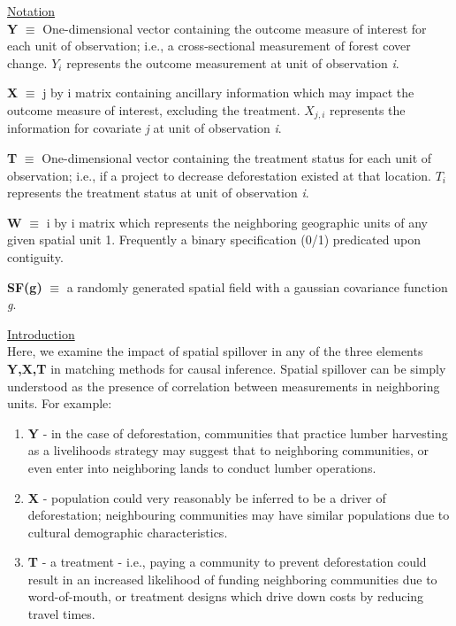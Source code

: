 \documentclass[10pt,a3paper]{report}
\begin{document}
\begin{flushleft}
\underline{Notation}\\
\vspace{0.1cm}
\textbf{Y} $\equiv$ One-dimensional vector containing the outcome measure of interest for each unit of observation; i.e., a cross-sectional measurement of forest cover change. $Y_{i}$ represents the outcome measurement at unit of observation \textit{i}. 
\vspace{0.25cm}

\textbf{X} $\equiv$ j by i matrix containing ancillary information which may impact the outcome measure of interest, excluding the treatment.  $X_{j,i}$ represents the information for covariate \textit{j} at unit of observation \textit{i}.
\vspace{0.25cm}

\textbf{T} $\equiv$ One-dimensional vector containing the treatment status for each unit of observation; i.e., if a project to decrease deforestation existed at that location.  $T_{i}$ represents the treatment status at unit of observation \textit{i}. \vspace{0.25cm}

\textbf{W} $\equiv$ i by i matrix which represents the neighboring geographic units of any given spatial unit 1.  Frequently a binary specification (0/1) predicated upon contiguity. 
\vspace{0.25cm}

\textbf{SF(g)} $\equiv$ a randomly generated spatial field with a gaussian covariance function \textit{g}.
\vspace{0.1cm}

\end{flushleft}
\underline{Introduction}\\
Here, we  examine the impact of spatial spillover in any of the three elements \textbf{Y,X,T} in matching methods for causal inference.  Spatial spillover can be simply understood as the presence of correlation between measurements in neighboring units.  For example:
\begin{enumerate}
\item \textbf{Y} - in the case of deforestation,  communities that practice lumber harvesting as a livelihoods strategy may suggest that to neighboring communities, or even enter into neighboring lands to conduct lumber operations.
\item \textbf{X} - population could very reasonably be inferred to be a driver of deforestation; neighbouring communities may have similar populations due to cultural demographic characteristics.
\item \textbf{T} - a treatment - i.e., paying a community to prevent deforestation could result in an increased likelihood of funding neighboring communities due to word-of-mouth, or treatment designs which drive down costs by reducing travel times.
\end{enumerate}
\end{document}
